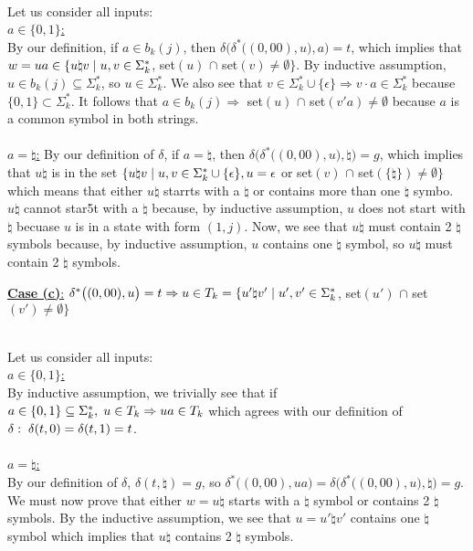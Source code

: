 \documentclass[11pt]{article}
\begin{document}
\begin{addmargin}[2em]{0em}
\ \\
Let us consider all inputs: \\
\underline{$a\in\{0,1\}$:} \\
By our definition, if $a\in b_k(j)$, then $\delta\Big(\delta^*\big((0,00),u\big),a\Big)=t$, which implies that $w=ua\in\{u\natural v\hspace{1mm}|\hspace{1mm}u,v\in\Sigma_k^*$, set$(u)$ $\cap$ set$(v)\neq\emptyset\}$. By inductive assumption, $u\in b_k(j)\subseteq\Sigma_k^*$, so $u\in\Sigma_k^*$. We also see that $v\in\Sigma_k^*\cup\{\epsilon\}\Rightarrow v\cdot a\in\Sigma_k^*$ because $\{0,1\}\subset\Sigma_k^*$. It follows that $a\in b_k(j)\Rightarrow$ set$(u)$ $\cap$ set$(v'a)\neq\emptyset$ because $a$ is a common symbol in both strings. \\ \\
\underline{$a=\natural$:} By our definition of $\delta$, if $a=\natural$, then $\delta\Big(\delta^*\big((0,00),u\big),\natural\Big)=g$, which implies that $u\natural$ is in the set $\{u\natural v\hspace{1mm}|\hspace{1mm}u,v\in\Sigma_k^*\cup\{\epsilon\},u=\epsilon$ or set$(v)$ $\cap$ set$(\{\natural\})\neq\emptyset\}$ which means that either $u\natural$ starrts with a $\natural$ or contains more than one $\natural$ symbo. $u\natural$ cannot star5t with a $\natural$ because, by inductive assumption, $u$ does not start with $\natural$ becuase $u$ is in a state with form $(1,j)$. Now, we see that $u\natural$ must contain 2 $\natural$ symbols because, by inductive assumption, $u$ contains one $\natural$ symbol, so $u\natural$ must contain 2 $\natural$ symbols.
\end{addmargin}
\underline{\textbf{Case (c)}:} $\delta^*\big((0,00),u\big)=t\Rightarrow u\in T_k=\{u'\natural v'\hspace{1mm}|\hspace{1mm}u',v'\in\Sigma_k^*$, set$(u')$ $\cap$ set$(v')\neq\emptyset\}$
\begin{addmargin}[2em]{0em}
\ \\
Let us consider all inputs: \\
\underline{$a\in\{0,1\}$:} \\
By inductive assumption, we trivially see that if $a\in\{0,1\}\subseteq\Sigma_k^*,\hspace{1mm}u\in T_k\Rightarrow ua\in T_k$ which agrees with our definition of $\delta:\hspace{1mm}\delta(t,0)=\delta(t,1)=t$. \\\\
\underline{$a=\natural$:} \\
By our definition of $\delta$, $\delta(t,\natural)=g$, so $\delta^*\big((0,00),ua)=\delta\Big(\delta^*\big((0,00),u\big),\natural\Big)=g$. We must now prove that either $w=u\natural$ starts with a $\natural$ symbol or contains 2 $\natural$ symbols. By the inductive assumption, we see that $u=u'\natural v'$ contains one $\natural$ symbol which implies that $u\natural$ contains 2 $\natural$ symbols.
\end{addmargin}
\end{document}

